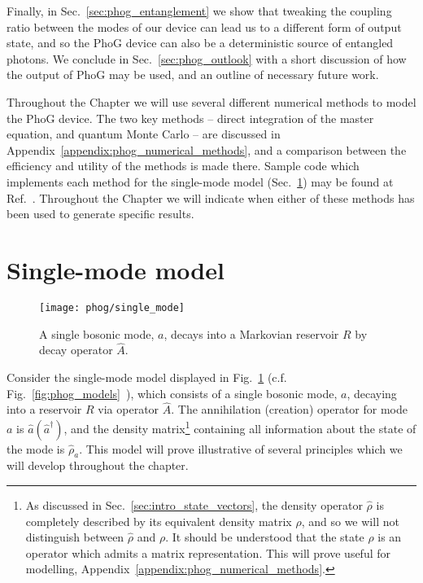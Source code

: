 Finally, in Sec.~\ref{sec:phog_entanglement} we show that tweaking the coupling ratio between the modes of our device can lead us to a different form of output state, and so the PhoG device can also be a deterministic source of entangled photons. We conclude in Sec.~\ref{sec:phog_outlook} with a short discussion of how the output of PhoG may be used, and an outline of necessary future work. %

Throughout the Chapter we will use several different numerical methods to model the PhoG device. The two key methods -- direct integration of the master equation, and quantum Monte Carlo -- are discussed in Appendix~\ref{appendix:phog_numerical_methods}, and a comparison between the efficiency and utility of the methods is made there. Sample code which implements each method for the single-mode model (Sec.~\ref{sec:phog_single_mode_model}) may be found at Ref.~\cite{phog_code}. Throughout the Chapter we will indicate when either of these methods has been used to generate specific results.


\section{Single-mode model}\label{sec:phog_single_mode_model}

\begin{figure}[htp]
\captionsetup{width=0.8\linewidth}
\centering
\texttt{[image: phog/single\_mode]}
\caption{\label{fig:phog_single_mode} A single bosonic mode, $a$, decays into a Markovian reservoir $R$ by decay operator $\hat{A}$. }
\end{figure}


Consider the single-mode model displayed in Fig.~\ref{fig:phog_single_mode} (c.f. Fig.~\ref{fig:phog_models}~\MakeUppercase{}), which consists of a single bosonic mode, $a$, decaying into a reservoir $R$ via operator $\hat{A}$. The annihilation (creation) operator for mode $a$ is $\hat{a} \left(\hat{a}^\dagger\right)$, and the density matrix\footnote{As discussed in Sec.~\ref{sec:intro_state_vectors}, the density operator $\hat{\rho}$ is completely described by its equivalent density matrix $\rho$, and so we will not distinguish between $\hat{\rho}$ and $\rho$. It should be understood that the state $\rho$ is an operator which admits a matrix representation. This will prove useful for modelling, Appendix~\ref{appendix:phog_numerical_methods}.} containing all information about the state of the mode is $\hat{\rho}_a$. This model will prove illustrative of several principles which we will develop throughout the chapter. 

